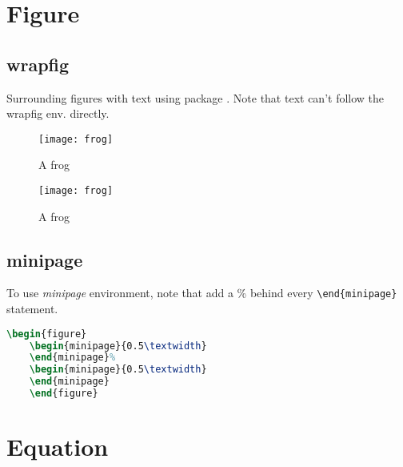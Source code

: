 \section{Figure}

\subsection{wrapfig}
Surrounding figures with text using package . Note
that text can't follow the wrapfig env. directly.

\begin{wrapfigure}{L}{0.3\textwidth}
    \centering 
    \texttt{[image: frog]}
    \caption{\label{fig:frog}A frog}
\end{wrapfigure}

\lipsum[1]

\begin{wrapfigure}{R}{0.3\textwidth}
    \centering 
    \texttt{[image: frog]}
    \caption{\label{fig:frog}A frog}
\end{wrapfigure}

\lipsum[2]


\subsection{minipage}
To use \emph{minipage} environment, note that add a \% behind every 
\verb|\end{minipage}| statement.
\begin{lstlisting}[language=TeX]
    \begin{figure}
	\begin{minipage}{0.5\textwidth}
	\end{minipage}%
	\begin{minipage}{0.5\textwidth}
	\end{minipage}
    \end{figure}
\end{lstlisting}
\section{Equation}


